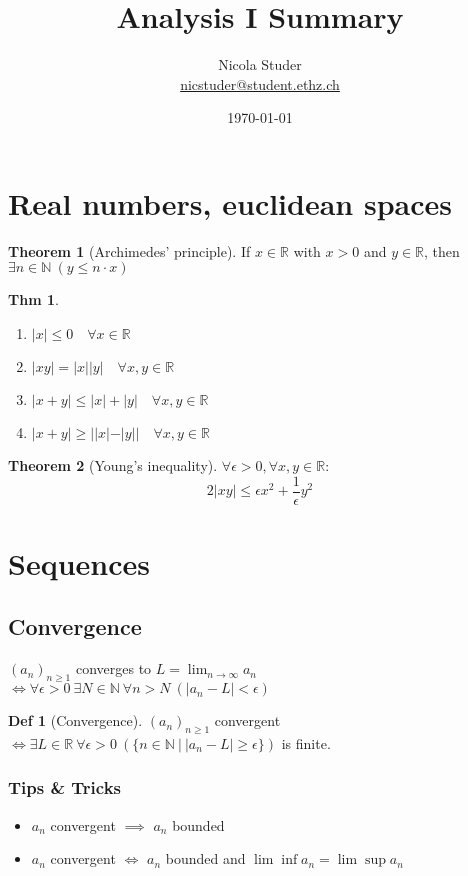 \documentclass[a4paper, 10pt]{article}
\title{Analysis I Summary}
\author{Nicola Studer \\ \href{mailto:nicstuder@student.ethz.ch}{nicstuder@student.ethz.ch}}
\date{\today}
\theoremstyle{definition}
\newtheorem*{theorem}{Thm}
\newtheorem*{definition}{Def}
\theoremstyle{named}
\newtheorem*{ntheorem_wrapper}{Theorem}
\newenvironment{ntheorem}%
    {\begin{mdframed}[style=important]\begin{ntheorem_wrapper}}%
    {\end{ntheorem_wrapper}\end{mdframed}}
\newcommand{\R}{\mathbb{R}}
\newcommand{\N}{\mathbb{N}}
\begin{document}
\maketitle

\section{Real numbers, euclidean spaces}
\begin{ntheorem}[Archimedes' principle]
    If $x \in \R$ with $x > 0$ and $y \in \R$, then $\exists n \in \N \ (y \leq n \cdot x)$
\end{ntheorem}

\begin{theorem}
    \begin{enumerate}[label=(\roman*)]
        \item $|x| \leq 0 \quad \forall x \in \R$
        \item $|xy| = |x||y| \quad \forall x, y \in \R$
        \item $|x + y| \leq |x| + |y| \quad \forall x, y \in \R$
        \item $|x + y| \geq ||x| - |y|| \quad \forall x, y \in \R$
    \end{enumerate}
\end{theorem}

\begin{ntheorem}[Young's inequality]
    $\forall \epsilon > 0, \forall x, y \in \R$:
    $$2 |xy| \leq \epsilon x^2 + \frac{1}{\epsilon} y^2$$
\end{ntheorem}

\section{Sequences}
\subsection{Convergence}
$(a_n)_{n \geq 1}$ converges to $L = \lim_{n \to \infty} a_n$ $\iff \forall \epsilon > 0 \ \exists N \in \N \ \forall n > N \ (|a_n - L | < \epsilon)$

\begin{definition}[Convergence]
    $(a_n)_{n \geq 1}$ convergent $\iff \exists L \in \R  \ \forall \epsilon > 0 \ (\{n \in \N \ | \ |a_n - L| \geq \epsilon \})$ is finite.
\end{definition}

\subsubsection{Tips \& Tricks}
\begin{itemize}
    \item $a_n$ convergent $\implies$ $a_n$ bounded
    \item $a_n$ convergent $\iff$ $a_n$ bounded and $\lim\inf a_n = \lim\sup a_n$
\end{itemize}
\end{document}
